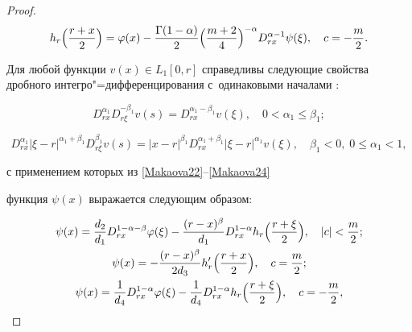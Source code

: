 \begin{proof}
\begin{gather}
h_r\Bigl(\frac{r+x}{2} \Bigr)=

\varphi(x)-\frac{\Gamma(1-\alpha)}{2} 

\Bigl( \frac{m+2}{4} \Bigr)^{-\alpha} 

 D^{\alpha-1}_{rx}  \psi(\xi) ,  \quad  c=-\frac{m}{2}.

\end{gather}



Для любой функции $v(x) \in L_1[0,r]$ справедливы следующие свойства   дробного интегро"=дифференцирования с~одинаковыми началами \cite{Nakhushev_13}:

\[

D^{\alpha_1}_{rx}D^{-\beta_1}_{r\xi} v(s)=D^{\alpha_1-\beta_1}_{rx}v(\xi),\quad 0<\alpha_1 \leq \beta_1;

\]

\[

D^{\alpha_1}_{rx} | \xi-r |^{\alpha_1+\beta_1}D^{\beta_1}_{r\xi} v(s)=

|x-r |^{\beta_1}D^{\alpha_1+\beta_1}_{rx} |\xi-r |^{\alpha_1} v(\xi),\quad 

\beta_1<0, \;  0\leq \alpha_1<1,

\]

с применением которых из \eqref{Makaova22}--\eqref{Makaova24}

функция $\psi(x)$ выражается следующим образом:

\begin{gather}

\label{Makaova25} 

 \psi(x)=

 \frac{d_2}{d_1}  D^{1-\alpha-\beta}_{rx} \varphi(\xi)-

 \frac{(r-x)^{\beta} }{d_1} D^{1-\alpha}_{rx} h_r \Bigl(\frac{r+\xi}{2} \Bigr),   \quad |c|<\frac{m}{2};

\\

\label{Makaova27} 

 \psi(x)=

- \frac{(r-x)^{\beta} }{2d_3}  h_r'\Bigl(\frac{r+x}{2} \Bigr),   \quad  c=\frac{m}{2};

\\

\label{Makaova27} 

 \psi(x)=

 \frac{1}{d_4}  D^{1-\alpha}_{rx} \varphi(\xi)-

 \frac{1 }{d_4} D^{1-\alpha}_{rx} h_r\Bigl(\frac{r+\xi}{2} \Bigr),   \quad  c=-\frac{m}{2},


\end{gather}
\end{proof}
